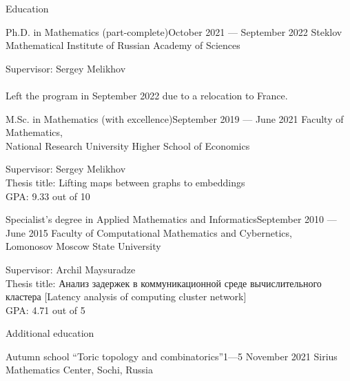 \documentclass{resume}
\begin{document}
\begin{rSection}{Education}
\begin{rSubsection}{Ph.D. in Mathematics (part-complete)}{October 2021 --- September 2022}{}
  Steklov Mathematical Institute of Russian Academy of Sciences\vspace{0.5em}

  Supervisor: Sergey Melikhov \\
  \\
  Left the program in September 2022 due to a relocation to France.
\end{rSubsection}

\begin{rSubsection}{M.Sc. in Mathematics (with excellence)}{September 2019 --- June 2021}{}
  Faculty of Mathematics, \\
  National Research University Higher School of Economics \vspace{0.5em}

  Supervisor: Sergey Melikhov \\
  Thesis title: Lifting maps between graphs to embeddings \\
  GPA: 9.33 out of 10
\end{rSubsection}

\begin{rSubsection}{Specialist's degree in Applied Mathematics and Informatics}{September 2010 --- June 2015}{}
  Faculty of Computational Mathematics and Cybernetics, \\
  Lomonosov Moscow State University \vspace{0.5em}

  Supervisor: Archil Maysuradze \\
  Thesis title: Анализ задержек в коммуникационной среде вычислительного кластера [Latency analysis of computing cluster network] \\
  GPA: 4.71 out of 5
\end{rSubsection}
\end{rSection}

\begin{rSection}{Additional education}
  \begin{rSubsection}{Autumn school ``Toric topology and combinatorics''}{1---5 November 2021}{}
    Sirius Mathematics Center, Sochi, Russia
  \end{rSubsection}
\end{rSection}
\end{document}
